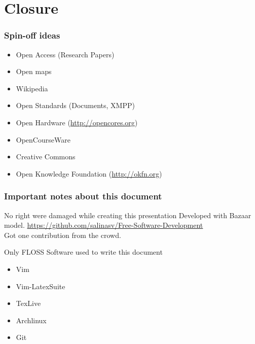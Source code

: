 \documentclass[hyperref={pdfpagelabels=false},xcolor=pst,pdf,fragile]{beamer}
\begin{document}
\section{Closure}

\begin{frame}
  \frametitle{Spin-off ideas}

  \begin{itemize}
	  \item Open Access (Research Papers)

	  \item Open maps
		  \pause
	  \item Wikipedia
		  \pause
	  \item Open Standards (Documents, XMPP)
		  \pause
	  \item Open Hardware (\url{http://opencores.org})
		  \pause
	  \item OpenCourseWare
		  \pause
	  \item Creative Commons
		  \pause
	  \item Open Knowledge Foundation (\url{http://okfn.org})
  \end{itemize}

\end{frame}

\begin{frame}
  \frametitle{Important notes about this document}

  \begin{block}{No right were damaged while creating this
	  presentation}
    Developed with Bazaar model.
	\url{https://github.com/salinasv/Free-Software-Development} \\
	Got one contribution from the crowd.
  \end{block}

  \begin{exampleblock}{Only FLOSS Software used to write this document}
	  \begin{itemize}
		  \item Vim
		  \item Vim-LatexSuite
		  \item TexLive
		  \item Archlinux
		  \item Git
	  \end{itemize}
  \end{exampleblock}

\end{frame}
\end{document}
